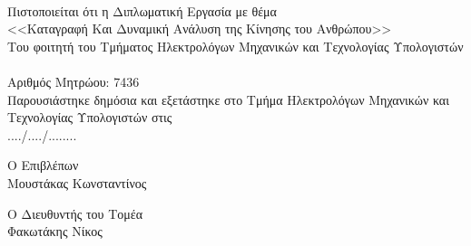 \thispagestyle{empty}
\newpage

\thispagestyle{empty}
\clearpage\mbox{}\clearpage

\begin{center}
    {}\\[1cm]
    Πιστοποιείται ότι η Διπλωματική Εργασία με θέμα\\[0.5cm]
    <<Καταγραφή Και Δυναμική Ανάλυση της Κίνησης του Ανθρώπου>>\\[1cm]
    Του φοιτητή του Τμήματος Ηλεκτρολόγων Μηχανικών και Τεχνολογίας Υπολογιστών\\[0.5cm]
    \\[10pt]
    Αριθμός Μητρώου: 7436\\[2cm]
    Παρουσιάστηκε δημόσια και εξετάστηκε στο Τμήμα Ηλεκτρολόγων Μηχανικών και Τεχνολογίας Υπολογιστών στις\\
    ..../..../........\\[9cm]
\end{center}

\begin{minipage}[t]{0.5\textwidth}
    \begin{flushleft}
        Ο Επιβλέπων\\
        Μουστάκας Κωνσταντίνος
    \end{flushleft}
\end{minipage}%
\begin{minipage}[t]{0.5\textwidth}
    \begin{flushright}
        Ο Διευθυντής του Τομέα\\
        Φακωτάκης Νίκος
    \end{flushright}
\end{minipage}%

\thispagestyle{empty}
\newpage
